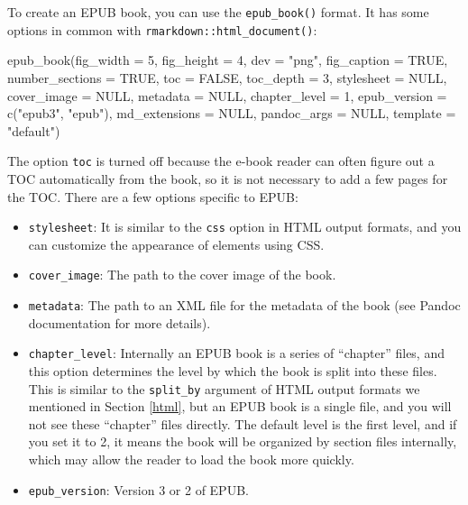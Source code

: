 \documentclass[
  12pt,
]{krantz}
\newenvironment{Shaded}{\begin{snugshade}}{\end{snugshade}}
\newcommand{\AttributeTok}[1]{\textcolor[rgb]{0.77,0.63,0.00}{#1}}
\newcommand{\ConstantTok}[1]{\textcolor[rgb]{0.00,0.00,0.00}{#1}}
\newcommand{\DecValTok}[1]{\textcolor[rgb]{0.00,0.00,0.81}{#1}}
\newcommand{\FunctionTok}[1]{\textcolor[rgb]{0.00,0.00,0.00}{#1}}
\newcommand{\NormalTok}[1]{#1}
\newcommand{\StringTok}[1]{\textcolor[rgb]{0.31,0.60,0.02}{#1}}
\providecommand{\tightlist}{%
  \setlength{\itemsep}{0pt}\setlength{\parskip}{0pt}}
\theoremstyle{definition}
\theoremstyle{definition}
\theoremstyle{definition}
\theoremstyle{definition}
\theoremstyle{remark}
\begin{document}
To create an EPUB book, you can use the \texttt{epub\_book()} format. It has some options in common with \texttt{rmarkdown::html\_document()}:

\begin{Shaded}
\begin{Highlighting}[]
\FunctionTok{epub\_book}\NormalTok{(}\AttributeTok{fig\_width =} \DecValTok{5}\NormalTok{, }\AttributeTok{fig\_height =} \DecValTok{4}\NormalTok{, }\AttributeTok{dev =} \StringTok{"png"}\NormalTok{,}
  \AttributeTok{fig\_caption =} \ConstantTok{TRUE}\NormalTok{, }\AttributeTok{number\_sections =} \ConstantTok{TRUE}\NormalTok{,}
  \AttributeTok{toc =} \ConstantTok{FALSE}\NormalTok{, }\AttributeTok{toc\_depth =} \DecValTok{3}\NormalTok{, }\AttributeTok{stylesheet =} \ConstantTok{NULL}\NormalTok{,}
  \AttributeTok{cover\_image =} \ConstantTok{NULL}\NormalTok{, }\AttributeTok{metadata =} \ConstantTok{NULL}\NormalTok{,}
  \AttributeTok{chapter\_level =} \DecValTok{1}\NormalTok{, }\AttributeTok{epub\_version =} \FunctionTok{c}\NormalTok{(}\StringTok{"epub3"}\NormalTok{, }\StringTok{"epub"}\NormalTok{),}
  \AttributeTok{md\_extensions =} \ConstantTok{NULL}\NormalTok{, }\AttributeTok{pandoc\_args =} \ConstantTok{NULL}\NormalTok{,}
  \AttributeTok{template =} \StringTok{"default"}\NormalTok{)}
\end{Highlighting}
\end{Shaded}

The option \texttt{toc} is turned off because the e-book reader can often figure out a TOC automatically from the book, so it is not necessary to add a few pages for the TOC. There are a few options specific to EPUB:

\begin{itemize}
\tightlist
\item
  \texttt{stylesheet}: It is similar to the \texttt{css} option in HTML output formats, and you can customize the appearance of elements using CSS.
\item
  \texttt{cover\_image}: The path to the cover image of the book.
\item
  \texttt{metadata}: The path to an XML file for the metadata of the book (see Pandoc documentation for more details).
\item
  \texttt{chapter\_level}: Internally an EPUB book is a series of ``chapter'' files, and this option determines the level by which the book is split into these files. This is similar to the \texttt{split\_by} argument of HTML output formats we mentioned in Section \ref{html}, but an EPUB book is a single file, and you will not see these ``chapter'' files directly. The default level is the first level, and if you set it to 2, it means the book will be organized by section files internally, which may allow the reader to load the book more quickly.
\item
  \texttt{epub\_version}: Version 3 or 2 of EPUB.
\end{itemize}
\end{document}
